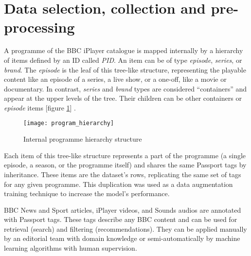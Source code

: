 
\section{Data selection, collection and pre-processing}


A programme of the BBC iPlayer catalogue is mapped internally by a hierarchy of items defined by an ID called \textit{PID}.
An item can be of type \textit{episode}, \textit{series}, or \textit{brand}. The \textit{episode} is the leaf of this tree-like structure,
representing the playable content like an episode of a series, a live show, or a one-off, like a movie or documentary.
In contrast, \textit{series} and \textit{brand} types are considered ``containers'' and appear at the upper levels of the tree.
Their children can be other containers or \textit{episode} items [figure \ref{fig:program_hierarchy}] \cite{BBC:ProgrammePages,BBC:ProgrammeUrlStructure}.

\begin{figure}[h]
  \centering
  \texttt{[image: program\_hierarchy]}
  \caption{Internal programme hierarchy structure}
  \label{fig:program_hierarchy}
\end{figure}

Each item of this tree-like structure represents a part of the programme
(a single episode, a season, or the programme itself)
and shares the same Passport tags by inheritance.
These items are the dataset's rows, replicating the same set of tags for any given programme.
This duplication was used as a data augmentation training technique to increase the model's performance.

BBC News and Sport articles, iPlayer videos, and Sounds audios are annotated with Passport tags.
These tags describe any BBC content and can be used for retrieval (search) and filtering (recommendations).
They can be applied manually by an editorial team with domain knowledge
or semi-automatically by machine learning algorithms with human supervision.

